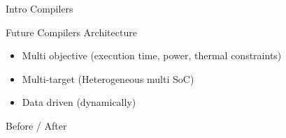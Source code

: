 %
\begin{Frame}{Intro Compilers}
      \begin{block}{Future Compilers Architecture}
        \begin{itemize}
        \item Multi objective (execution time, power, thermal constraints)
        \item Multi-target (Heterogeneous multi SoC)
        \item Data driven (dynamically)
        \end{itemize}
      \end{block} 
      \begin{block}{Before / After}
      \end{block}   
\end{Frame}


